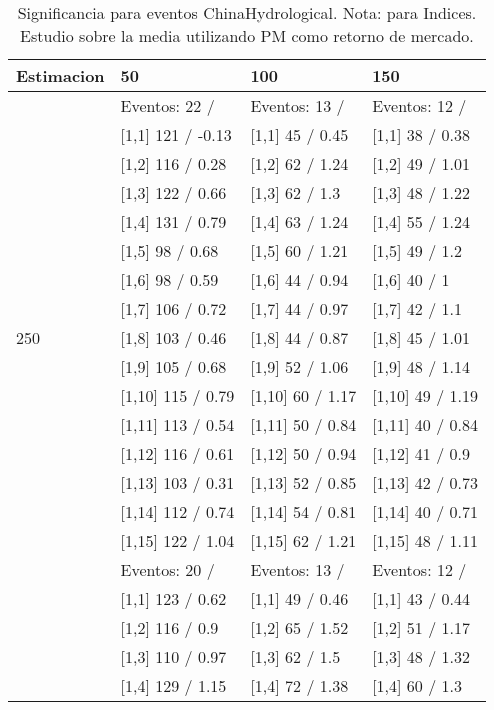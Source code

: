 \begin{table}

\caption{Significancia para eventos ChinaHydrological. Nota: para Indices. Estudio sobre la media utilizando PM como retorno de mercado.}
\centering
\begin{tabular}[t]{llll}
\toprule
Estimacion & 50 & 100 & 150\\
\midrule
 & Eventos:  22 / & Eventos:  13 / & Eventos:  12 /\\
 & {}[1,1] 121  / -0.13 & {}[1,1] 45  / 0.45 & {}[1,1] 38  / 0.38\\
 & {}[1,2] 116  / 0.28 & {}[1,2] 62  / 1.24 & {}[1,2] 49  / 1.01\\
 & {}[1,3] 122  / 0.66 & {}[1,3] 62  / 1.3 & {}[1,3] 48  / 1.22\\
 & {}[1,4] 131  / 0.79 & {}[1,4] 63  / 1.24 & {}[1,4] 55  / 1.24\\
\addlinespace
 & {}[1,5] 98  / 0.68 & {}[1,5] 60  / 1.21 & {}[1,5] 49  / 1.2\\
 & {}[1,6] 98  / 0.59 & {}[1,6] 44  / 0.94 & {}[1,6] 40  / 1\\
 & {}[1,7] 106  / 0.72 & {}[1,7] 44  / 0.97 & {}[1,7] 42  / 1.1\\
250 & {}[1,8] 103  / 0.46 & {}[1,8] 44  / 0.87 & {}[1,8] 45  / 1.01\\
 & {}[1,9] 105  / 0.68 & {}[1,9] 52  / 1.06 & {}[1,9] 48  / 1.14\\
\addlinespace
 & {}[1,10] 115  / 0.79 & {}[1,10] 60  / 1.17 & {}[1,10] 49  / 1.19\\
 & {}[1,11] 113  / 0.54 & {}[1,11] 50  / 0.84 & {}[1,11] 40  / 0.84\\
 & {}[1,12] 116  / 0.61 & {}[1,12] 50  / 0.94 & {}[1,12] 41  / 0.9\\
 & {}[1,13] 103  / 0.31 & {}[1,13] 52  / 0.85 & {}[1,13] 42  / 0.73\\
 & {}[1,14] 112  / 0.74 & {}[1,14] 54  / 0.81 & {}[1,14] 40  / 0.71\\
\addlinespace
 & {}[1,15] 122  / 1.04 & {}[1,15] 62  / 1.21 & {}[1,15] 48  / 1.11\\
 & Eventos:  20 / & Eventos:  13 / & Eventos:  12 /\\
 & {}[1,1] 123  / 0.62 & {}[1,1] 49  / 0.46 & {}[1,1] 43  / 0.44\\
 & {}[1,2] 116  / 0.9 & {}[1,2] 65  / 1.52 & {}[1,2] 51  / 1.17\\
 & {}[1,3] 110  / 0.97 & {}[1,3] 62  / 1.5 & {}[1,3] 48  / 1.32\\
\addlinespace
 & {}[1,4] 129  / 1.15 & {}[1,4] 72  / 1.38 & {}[1,4] 60  / 1.3\\

\end{tabular}
\end{table}
